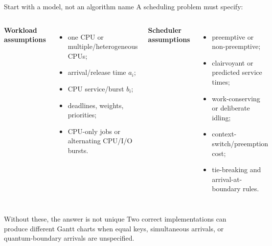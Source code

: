 \documentclass[aspectratio=169,11pt]{beamer}
\begin{document}
\begin{frame}{Start with a model, not an algorithm name}
  A scheduling problem must specify:
  \begin{columns}[T,onlytextwidth]
      \textbf{Workload assumptions}
      \begin{itemize}
        \item one CPU or multiple/heterogeneous CPUs;
        \item arrival/release time $a_i$;
        \item CPU service/burst $b_i$;
        \item deadlines, weights, priorities;
        \item CPU-only jobs or alternating CPU/I/O bursts.
      \end{itemize}
      \textbf{Scheduler assumptions}
      \begin{itemize}
        \item preemptive or non-preemptive;
        \item clairvoyant or predicted service times;
        \item work-conserving or deliberate idling;
        \item context-switch/preemption cost;
        \item tie-breaking and arrival-at-boundary rules.
      \end{itemize}
  \end{columns}
  \begin{alertblock}{Without these, the answer is not unique}
    Two correct implementations can produce different Gantt charts when equal keys, simultaneous arrivals, or quantum-boundary arrivals are unspecified.
  \end{alertblock}
\end{frame}
\end{document}

